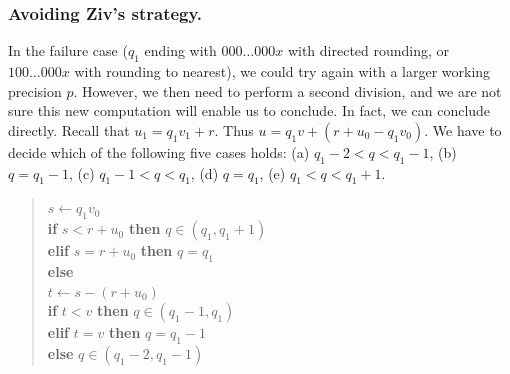 \documentclass[12pt]{amsart}
\def\q{\hspace*{5mm}}
\begin{document}
\subsubsection{Avoiding Ziv's strategy.}
In the failure case ($q_1$ ending with $000\ldots 000x$ with directed rounding,
or $100 \ldots 000x$ with rounding to nearest),
we could try again with a larger working precision $p$.
However, we then need to perform a second
division, and we are not sure this new computation will enable us to conclude.
In fact, we can conclude directly. Recall that $u_1 = q_1 v_1 + r$.
Thus $u = q_1 v + (r + u_0 - q_1 v_0)$.
We have to decide which of the following five cases holds:
(a) $q_1 - 2 < q < q_1 - 1$, (b) $q = q_1-1$,
(c) $q_1-1 < q < q_1$, (d) $q=q_1$, (e) $q_1 < q < q_1+1$.
\begin{quote}
$s \leftarrow q_1 v_0$ \\
\textbf{if} $s < r + u_0$ \textbf{then} $q \in (q_1, q_1+1)$ \\
\textbf{elif} $s = r + u_0$ \textbf{then} $q = q_1$ \\
\textbf{else} \\ %
\q $t \leftarrow s - (r + u_0)$ \\ %
\q \textbf{if} $t < v$ \textbf{then} $q \in (q_1 - 1, q_1)$ \\
\textbf{elif} $t=v$ \textbf{then} $q = q_1-1$ \\
\textbf{else} $q \in (q_1 - 2, q_1-1)$
\end{quote}
\end{document}
